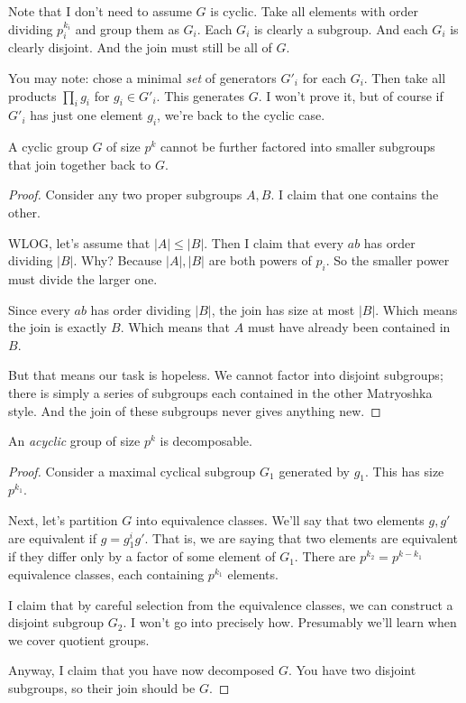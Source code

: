 \documentclass[11pt, oneside]{amsart}
\begin{document}
\begin{remark}
  Note that I don't need to assume $G$ is cyclic. Take all elements with
  order dividing $p_i^{k_i}$ and group them as $G_i$. Each $G_i$ is
  clearly a subgroup. And each $G_i$ is clearly disjoint. And the join
  must still be all of $G$.

  You may note: chose a minimal \emph{set} of generators $G'_i$ for each
  $G_i$. Then take all products $\prod_i g_i$ for $g_i \in G'_i$. This
  generates $G$. I won't prove it, but of course if $G'_i$ has just one
  element $g_i$, we're back to the cyclic case.
\end{remark}

\begin{theorem}
  A cyclic group $G$ of size $p^k$ cannot be further factored into
  smaller subgroups that join together back to $G$.
\end{theorem}

\begin{proof}
  Consider any two proper subgroups $A, B$. I claim that one contains
  the other.

  WLOG, let's assume that $|A| \leq |B|$. Then I claim that every $ab$
  has order dividing $|B|$. Why? Because $|A|, |B|$ are both powers of
  $p_i$. So the smaller power must divide the larger one.

  Since every $ab$ has order dividing $|B|$, the join has size at most
  $|B|$. Which means the join is exactly $B$. Which means that $A$ must
  have already been contained in $B$.

  But that means our task is hopeless. We cannot factor into disjoint
  subgroups; there is simply a series of subgroups each contained in the
  other Matryoshka style. And the join of these subgroups never gives
  anything new.
\end{proof}

\begin{theorem}
  An \emph{acyclic} group of size $p^k$ is decomposable.
\end{theorem}

\begin{proof}
  Consider a maximal cyclical subgroup $G_1$ generated by $g_1$. This
  has size $p^{k_1}$.

  Next, let's partition $G$ into equivalence classes. We'll say that two
  elements $g, g'$ are equivalent if $g = g_1^i g'$. That is, we are
  saying that two elements are equivalent if they differ only by a
  factor of some element of $G_1$. There are $p^{k_2} = p^{k - k_1}$
  equivalence classes, each containing $p^{k_1}$ elements.

  I claim that by careful selection from the equivalence classes, we can
  construct a disjoint subgroup $G_2$. I won't go into precisely how.
  Presumably we'll learn when we cover quotient groups.

  Anyway, I claim that you have now decomposed $G$. You have two
  disjoint subgroups, so their join should be $G$.
\end{proof}
\end{document}
